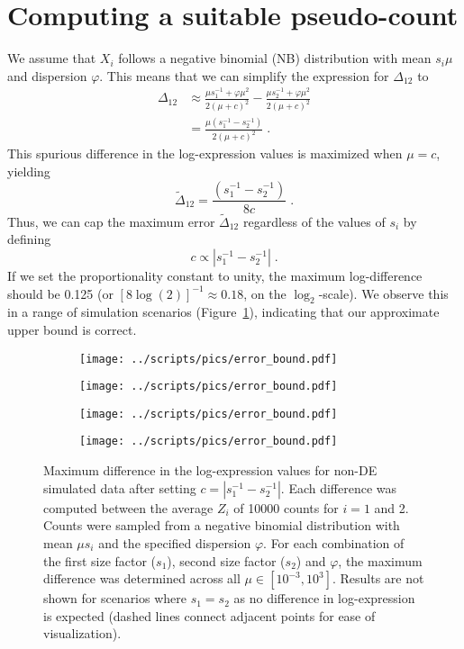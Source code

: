\documentclass[10pt,letterpaper]{article}
\begin{document}
\section{Computing a suitable pseudo-count}
We assume that $X_i$ follows a negative binomial (NB) distribution with mean $s_i\mu$ and dispersion $\varphi$.
This means that we can simplify the expression for $\Delta_{12}$ to
\begin{align*}
\Delta_{12} 
&\approx \frac{\mu s_1^{-1} + \varphi \mu^2}{2(\mu + c)^2} - \frac{\mu s_2^{-1} + \varphi \mu^2}{2(\mu + c)^2} \\ 
&= \frac{\mu (s_1^{-1} - s_2^{-1})}{2(\mu + c)^2} \;.
\end{align*}
This spurious difference in the log-expression values is maximized when $\mu = c$, yielding 
\[
\tilde\Delta_{12} = \frac{(s_1^{-1} - s_2^{-1})}{8c} \;.
\]
Thus, we can cap the maximum error $\tilde\Delta_{12}$ regardless of the values of $s_i$ by defining
\[
    c \propto |s_1^{-1} - s_2^{-1}| \;.
\]
If we set the proportionality constant to unity, the maximum log-difference should be 0.125 (or $[8\log(2)]^{-1} \approx 0.18$, on the $\log_2$-scale).
We observe this in a range of simulation scenarios (Figure~\ref{fig:cappederr}), indicating that our approximate upper bound is correct. 

\begin{figure}[btp]
\centering
\begin{subfigure}[b]{0.49\textwidth}
    \texttt{[image: ../scripts/pics/error\_bound.pdf]}
    \caption{}
\end{subfigure}
\begin{subfigure}[b]{0.49\textwidth}
    \texttt{[image: ../scripts/pics/error\_bound.pdf]}
    \caption{}
\end{subfigure}
\begin{subfigure}[b]{0.49\textwidth}
    \texttt{[image: ../scripts/pics/error\_bound.pdf]}
    \caption{}
\end{subfigure}
\begin{subfigure}[b]{0.49\textwidth}
    \texttt{[image: ../scripts/pics/error\_bound.pdf]}
    \caption{}
\end{subfigure}
\caption{Maximum difference in the log-expression values for non-DE simulated data after setting $c = |s_1^{-1} - s_2^{-1}|$.
Each difference was computed between the average $Z_i$ of 10000 counts for $i=1$ and 2.
Counts were sampled from a negative binomial distribution with mean $\mu s_i$ and the specified dispersion $\varphi$.
For each combination of the first size factor ($s_1$), second size factor ($s_2$) and $\varphi$, the maximum difference was determined across all $\mu \in [10^{-3}, 10^3]$.
Results are not shown for scenarios where $s_1=s_2$ as no difference in log-expression is expected (dashed lines connect adjacent points for ease of visualization).
}
\label{fig:cappederr}
\end{figure}
\end{document}
